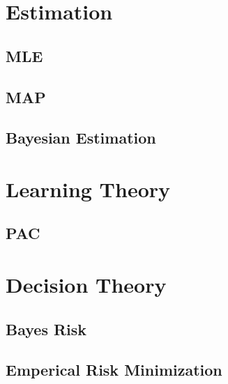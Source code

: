 \documentclass[18pt,a3paper,landscape, ncols=2]{cheatsheet}
\begin{document}

\section{Estimation} \seperator
	\subsection{MLE}
		\begin{mdframed}
		\end{mdframed}
	\subsection{MAP}
		\begin{mdframed}
		\end{mdframed}
	\subsection{Bayesian Estimation}
		\begin{mdframed}
		\end{mdframed}
\section{Learning Theory} \seperator
	\subsection{PAC}
		\begin{mdframed}
		\end{mdframed}

\section{Decision Theory} \seperator
	\subsection{Bayes Risk}
		\begin{mdframed}
		\end{mdframed}
	\subsection{Emperical Risk Minimization}
		\begin{mdframed}
		\end{mdframed}
	
\end{document}
